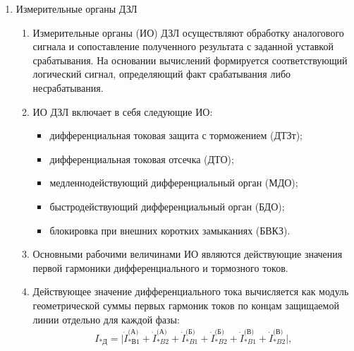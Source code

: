\begin{enumerate}
\item Измерительные органы ДЗЛ
\begin{enumerate}
\item Измерительные органы (ИО) ДЗЛ осуществляют обработку аналогового сигнала и сопоставление полученного результата с заданной уставкой срабатывания. На основании вычислений формируется соответствующий логический сигнал, определяющий факт срабатывания либо несрабатывания.
\item ИО ДЗЛ включает в себя следующие ИО:
  \begin{itemize}
    \item дифференциальная токовая защита с торможением (ДТЗт);
    \item дифференциальная токовая отсечка (ДТО);
    \item медленнодействующий дифференциальный орган (МДО);
    \item быстродействующий дифференциальный орган (БДО);
    \item блокировка при внешних коротких замыканиях (БВКЗ).
  \end{itemize}
\item Основными рабочими величинами ИО являются действующие значения первой гармоники дифференциального и тормозного токов.
\item Действующее значение дифференциального тока вычисляется как модуль геометрической суммы первых гармоник токов по концам защищаемой линии отдельно для каждой фазы:
  \begin{align}
    I_\textit{*Д}=\mid \dot{I}_\textit{*В1}^\textit{(А)} + \dot{I}_\textit{*B2}^\textit{(А)} + \dot{I}_\textit{*B1}^\textit{(Б)} + \dot{I}_\textit{*B2}^\textit{(Б)} + \dot{I}_\textit{*B1}^\textit{(В)} + \dot{I}_\textit{*B2}^\textit{(В)}\mid,
  \end{align}
\end{enumerate}
\end{enumerate}
